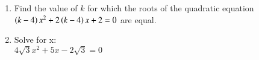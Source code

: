 \begin{enumerate}
\item Find the value of $k$ for which the roots of the quadratic equation $\left(k - 4\right) x^2 + 2\left(k-4\right) x + 2 =0$ are equal.\\
\item Solve for x:\\
$4\sqrt 3 x^2 + 5x - 2\sqrt 3 = 0$\\
\end{enumerate}
